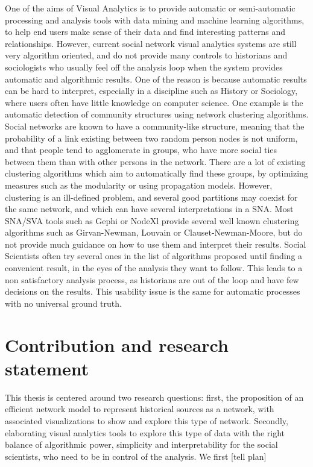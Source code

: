 One of the aims of Visual Analytics is to provide automatic or semi-automatic processing and analysis tools with data mining and machine learning algorithms, to help end users make sense of their data and find interesting patterns and relationships.
However, current social network visual analytics systems are still very algorithm oriented, and do not provide many controls to historians and sociologists who usually feel off the analysis loop when the system provides automatic and algorithmic results. One of the reason is because automatic results can be hard to interpret, especially in a discipline such as History or Sociology, where users often have little knowledge on computer science.
One example is the automatic detection of community structures using network clustering algorithms. Social networks are known to have a community-like structure, meaning that the probability of a link existing between two random person nodes is not uniform, and that people tend to agglomerate in groups, who have more social ties between them than with other persons in the network.
There are a lot of existing clustering algorithms which aim to automatically find these groups, by optimizing measures such as the modularity or using propagation models.
However, clustering is an ill-defined problem, and several good partitions may coexist for the same network, and which can have several interpretations in a SNA. Most SNA/SVA tools such as Gephi or NodeXl provide several well known clustering algorithms such as Girvan-Newman, Louvain or Clauset-Newman-Moore, but do not provide much guidance on how to use them and interpret their results.
Social Scientists often try several ones in the list of algorithms proposed until finding a convenient result, in the eyes of the analysis they want to follow.
This leads to a non satisfactory analysis process, as historians are out of the loop and have few decisions on the results. This usability issue is the same for automatic processes with no universal ground truth.

\section{Contribution and research statement}

This thesis is centered around two research questions: first, the proposition of an efficient network model to represent historical sources as a network, with associated visualizations to show and explore this type of network. Secondly, elaborating visual analytics tools to explore this type of data with the right balance of algorithmic power, simplicity and interpretability for the social scientists, who need to be in control of the analysis. We first [tell plan]
